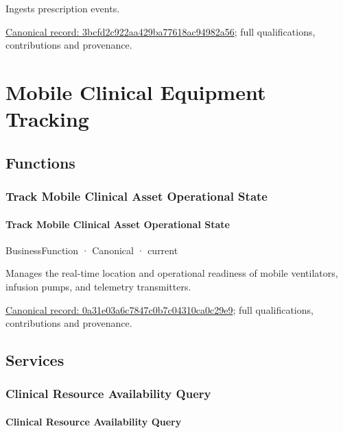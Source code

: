 Ingests prescription events.


{\footnotesize \href{../../../../continuum/business/business-service/3bcfd2c922aa429ba77618ac94982a56.md}{Canonical record: 3bcfd2c922aa429ba77618ac94982a56}; full qualifications, contributions and provenance.}\par
\section{Mobile Clinical Equipment Tracking}

\subsection{Functions}

\subsubsection{Track Mobile Clinical Asset Operational State}

\paragraph{Track Mobile Clinical Asset Operational State}

\label{element:0a31e03a6c7847c0b7c04310ca0c29e9}
{\small BusinessFunction · Canonical · current}\par

Manages the real-time location and operational readiness of mobile ventilators, infusion pumps, and telemetry transmitters.


{\footnotesize \href{../../../../continuum/business/business-function/0a31e03a6c7847c0b7c04310ca0c29e9.md}{Canonical record: 0a31e03a6c7847c0b7c04310ca0c29e9}; full qualifications, contributions and provenance.}\par
\subsection{Services}

\subsubsection{Clinical Resource Availability Query}

\paragraph{Clinical Resource Availability Query}

